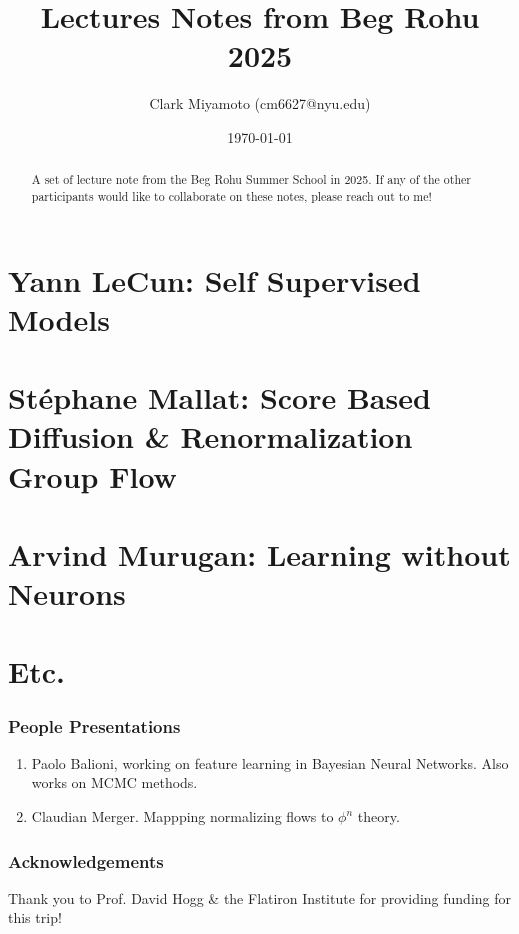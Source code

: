 \documentclass[12pt,fleqn]{article}
\title{Lectures Notes from Beg Rohu 2025}
\author{Clark Miyamoto (cm6627@nyu.edu)}
\date{\today}
\numberwithin{equation}{section} %
\begin{document}
\maketitle
\begin{abstract}
	A set of lecture note from the Beg Rohu Summer School in 2025. If any of the other participants would like to collaborate on these notes, please reach out to me!
\end{abstract}

\tableofcontents
\newpage

\part{Yann LeCun: Self Supervised Models}

\newpage

\part{St\'ephane Mallat: Score Based Diffusion \& Renormalization Group Flow}

\newpage

\part{Arvind Murugan: Learning without Neurons}

\newpage

\part{Etc.}

\section{People Presentations} 
\begin{enumerate}
	\item Paolo Balioni, working on feature learning in Bayesian Neural Networks. Also works on MCMC methods.
	\item Claudian Merger. Mappping normalizing flows to $\phi^n$ theory.
\end{enumerate}

\section{Acknowledgements}
Thank you to Prof. David Hogg \& the Flatiron Institute for providing funding for this trip!
\end{document}
